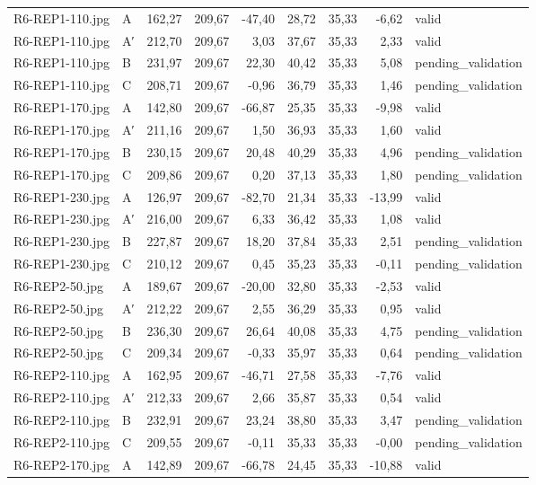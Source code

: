 \begin{scriptsize}
\begin{longtable}{@{}llrrrrrrl@{}}
R6-REP1-110.jpg & A & 162,27 & 209,67 & -47,40 & 28,72 & 35,33 & -6,62 & valid \\
R6-REP1-110.jpg & A′ & 212,70 & 209,67 & 3,03 & 37,67 & 35,33 & 2,33 & valid \\
R6-REP1-110.jpg & B & 231,97 & 209,67 & 22,30 & 40,42 & 35,33 & 5,08 & pending\_validation \\
R6-REP1-110.jpg & C & 208,71 & 209,67 & -0,96 & 36,79 & 35,33 & 1,46 & pending\_validation \\
R6-REP1-170.jpg & A & 142,80 & 209,67 & -66,87 & 25,35 & 35,33 & -9,98 & valid \\
R6-REP1-170.jpg & A′ & 211,16 & 209,67 & 1,50 & 36,93 & 35,33 & 1,60 & valid \\
R6-REP1-170.jpg & B & 230,15 & 209,67 & 20,48 & 40,29 & 35,33 & 4,96 & pending\_validation \\
R6-REP1-170.jpg & C & 209,86 & 209,67 & 0,20 & 37,13 & 35,33 & 1,80 & pending\_validation \\
R6-REP1-230.jpg & A & 126,97 & 209,67 & -82,70 & 21,34 & 35,33 & -13,99 & valid \\
R6-REP1-230.jpg & A′ & 216,00 & 209,67 & 6,33 & 36,42 & 35,33 & 1,08 & valid \\
R6-REP1-230.jpg & B & 227,87 & 209,67 & 18,20 & 37,84 & 35,33 & 2,51 & pending\_validation \\
R6-REP1-230.jpg & C & 210,12 & 209,67 & 0,45 & 35,23 & 35,33 & -0,11 & pending\_validation \\
R6-REP2-50.jpg & A & 189,67 & 209,67 & -20,00 & 32,80 & 35,33 & -2,53 & valid \\
R6-REP2-50.jpg & A′ & 212,22 & 209,67 & 2,55 & 36,29 & 35,33 & 0,95 & valid \\
R6-REP2-50.jpg & B & 236,30 & 209,67 & 26,64 & 40,08 & 35,33 & 4,75 & pending\_validation \\
R6-REP2-50.jpg & C & 209,34 & 209,67 & -0,33 & 35,97 & 35,33 & 0,64 & pending\_validation \\
R6-REP2-110.jpg & A & 162,95 & 209,67 & -46,71 & 27,58 & 35,33 & -7,76 & valid \\
R6-REP2-110.jpg & A′ & 212,33 & 209,67 & 2,66 & 35,87 & 35,33 & 0,54 & valid \\
R6-REP2-110.jpg & B & 232,91 & 209,67 & 23,24 & 38,80 & 35,33 & 3,47 & pending\_validation \\
R6-REP2-110.jpg & C & 209,55 & 209,67 & -0,11 & 35,33 & 35,33 & -0,00 & pending\_validation \\
R6-REP2-170.jpg & A & 142,89 & 209,67 & -66,78 & 24,45 & 35,33 & -10,88 & valid \\

\end{longtable}
\end{scriptsize}
